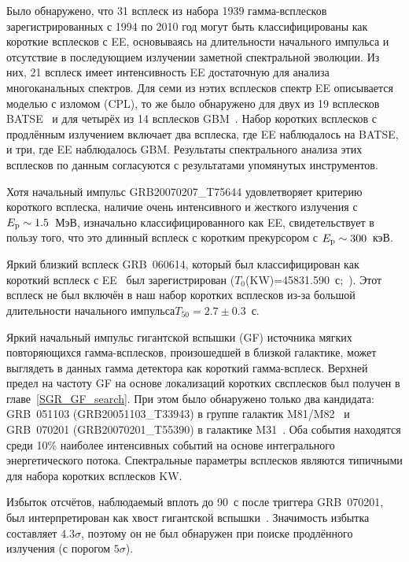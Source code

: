 Было обнаружено, что 31 всплеск из набора 1939 \kws гамма-всплесков зарегистрированных
с 1994 по 2010 год могут быть классифицированы как короткие всплесков с EE, 
основываясь на длительности начального импульса и отсутствие в последующием излучении 
заметной спектральной эволюции. Из них, 21 всплеск имеет интенсивность EE достаточную
для анализа многоканальных спектров. Для семи из нэтих всплесков спектр EE описывается
моделью с изломом (CPL), то же было обнаружено для двух из 19 всплесков BATSE~\citep{Bostanci_2013MNRAS}
и для четырёх из 14 всплесков GBM~\citep{Kaneko_2015MNRAS}.
Набор коротких всплесков с продлённым излучением \kws включает два всплеска, 
где EE наблюдалось на BATSE, и три, где EE наблюдалось GBM. Результаты спектрального
анализа этих всплесков по данным \kws согласуются с результатами упомянутых инструментов.

Хотя начальный импульс GRB20070207\_T75644 удовлетворяет критерию короткого всплеска,
наличие очень интенсивного и жесткого излучения с $E_{\mathrm{p}} \sim 1.5$~МэВ, 
изначально классифицированного как EE, свидетельствует в пользу того, что это
длинный всплеск с коротким прекурсором с $E_{\mathrm{p}} \sim 300$~кэВ.
 
Яркий близкий всплеск GRB~060614, который был классифицирован как короткий 
всплеск с EE~\citep{Gehrels_2006Nature} был зарегистрирован \kws ($T_0$(KW)=45831.590~с;~\citep{Golenetskii_GCN5264}).
Этот всплеск не был включён в наш набор коротких всплесков из-за большой 
длительности начального импульса$T_{50}=2.7 \pm 0.3$~с.

Яркий начальный импульс гигантской вспышки (GF) источника мягких повторяющихся гамма-всплесков, 
произошедшей в близкой галактике, может выглядеть в данных гамма детектора как короткий гамма-всплеск. 
Верхней предел на частоту GF на основе локализаций коротких свсплесков \kws был
получен в главе~\ref{SGR_GF_search}. При этом было обнаружено только два кандидата:
GRB~051103 (GRB20051103\_T33943) в группе галактик M81/M82~\citep{Frederiks_2007AstLett} и 
GRB~070201 (GRB20070201\_T55390) в галактике M31~\citep{Mazets_2008ApJ}.
Оба события находятся среди 10\% наиболее интенсивных событий на основе интегрального 
энергетического потока. Спектральные параметры всплесков являются типичными для 
набора коротких всплесков KW.

Избыток отсчётов, наблюдаемый вплоть до 90~с после триггера GRB~070201, 
был интерпретирован как хвост гигантской вспышки~\citep{Mazets_2008ApJ}.
Значимость избытка составляет $4.3\sigma$, поэтому он не был обнаружен при 
поиске продлённого излучения (с порогом $5\sigma$).

